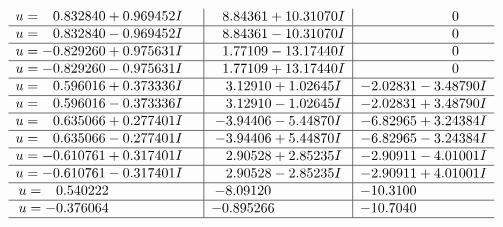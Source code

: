 \documentclass[1p]{elsarticle_modified}
\theoremstyle{definition}
\begin{document}
$$\begin{array}{c|c|c}
\begin{aligned}
u &= \phantom{-}0.832840 + 0.969452 I\end{aligned}
 & \phantom{-}8.84361 + 10.31070 I & \phantom{-0.000000 } 0 \\ \hline\begin{aligned}
u &= \phantom{-}0.832840 - 0.969452 I\end{aligned}
 & \phantom{-}8.84361 - 10.31070 I & \phantom{-0.000000 } 0 \\ \hline\begin{aligned}
u &= -0.829260 + 0.975631 I\end{aligned}
 & \phantom{-}1.77109 - 13.17440 I & \phantom{-0.000000 } 0 \\ \hline\begin{aligned}
u &= -0.829260 - 0.975631 I\end{aligned}
 & \phantom{-}1.77109 + 13.17440 I & \phantom{-0.000000 } 0 \\ \hline\begin{aligned}
u &= \phantom{-}0.596016 + 0.373336 I\end{aligned}
 & \phantom{-}3.12910 + 1.02645 I & -2.02831 - 3.48790 I \\ \hline\begin{aligned}
u &= \phantom{-}0.596016 - 0.373336 I\end{aligned}
 & \phantom{-}3.12910 - 1.02645 I & -2.02831 + 3.48790 I \\ \hline\begin{aligned}
u &= \phantom{-}0.635066 + 0.277401 I\end{aligned}
 & -3.94406 - 5.44870 I & -6.82965 + 3.24384 I \\ \hline\begin{aligned}
u &= \phantom{-}0.635066 - 0.277401 I\end{aligned}
 & -3.94406 + 5.44870 I & -6.82965 - 3.24384 I \\ \hline\begin{aligned}
u &= -0.610761 + 0.317401 I\end{aligned}
 & \phantom{-}2.90528 + 2.85235 I & -2.90911 - 4.01001 I \\ \hline\begin{aligned}
u &= -0.610761 - 0.317401 I\end{aligned}
 & \phantom{-}2.90528 - 2.85235 I & -2.90911 + 4.01001 I \\ \hline\begin{aligned}
u &= \phantom{-}0.540222\phantom{ +0.000000I}\end{aligned}
 & -8.09120\phantom{ +0.000000I} & -10.3100\phantom{ +0.000000I} \\ \hline\begin{aligned}
u &= -0.376064\phantom{ +0.000000I}\end{aligned}
 & -0.895266\phantom{ +0.000000I} & -10.7040\phantom{ +0.000000I}\\
 \hline 
 \end{array}$$\newpage
\end{document}
